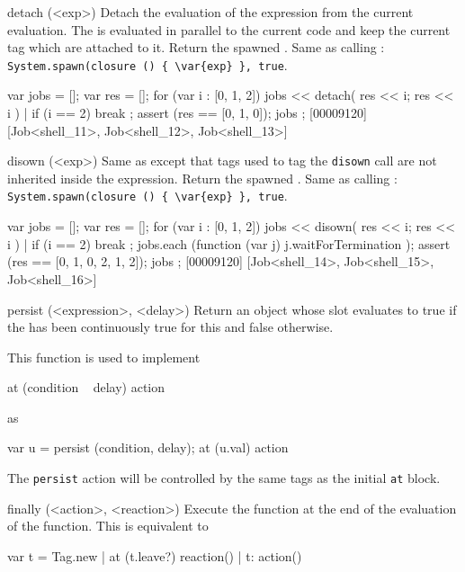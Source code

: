 \begin{urbiscriptapi}

\item[detach](<exp>)%
  Detach the evaluation of the expression  from the current
  evaluation.  The  is evaluated in parallel to the current code
  and keep the current tag which are attached to it.  Return the spawned
  .  Same as calling :
  \lstinline|System.spawn(closure () { \var{exp} }, true|.

\begin{urbiscript}
{
  var jobs = [];
  var res = [];
  for (var i : [0, 1, 2])
  {
    jobs << detach({ res << i; res << i }) |
    if (i == 2)
      break
  };
  assert (res == [0, 1, 0]);
  jobs
};
[00009120] [Job<shell_11>, Job<shell_12>, Job<shell_13>]
\end{urbiscript}

\item[disown](<exp>)%
  Same as  except that tags used to tag the
  \lstinline|disown| call are not inherited inside the expression.  Return
  the spawned .  Same as calling :
  \lstinline|System.spawn(closure () { \var{exp} }, true|.

\begin{urbiscript}
{
  var jobs = [];
  var res = [];
  for (var i : [0, 1, 2])
  {
    jobs << disown({ res << i; res << i }) |
    if (i == 2)
      break
  };
  jobs.each (function (var j) { j.waitForTermination });
  assert (res == [0, 1, 0, 2, 1, 2]);
  jobs
};
[00009120] [Job<shell_14>, Job<shell_15>, Job<shell_16>]
\end{urbiscript}

\item[persist](<expression>, <delay>)%
  Return an object whose  slot evaluates to true if the
   has been continuously true for this  and false
  otherwise.

  This function is used to implement

\begin{urbiunchecked}
at (condition ~ delay)
  action
\end{urbiunchecked}

  \noindent
  as

\begin{urbiunchecked}
var u = persist (condition, delay);
at (u.val)
  action
\end{urbiunchecked}

  The \lstinline|persist| action will be controlled by the same tags
  as the initial \lstinline|at| block.


\item[finally](<action>, <reaction>)%
  Execute the  function at the end of the evaluation of
  the  function.  This is equivalent to

\begin{urbiunchecked}
{
  var t = Tag.new |
  at (t.leave?)
    reaction() |
  t: action()
}
\end{urbiunchecked}
\end{urbiscriptapi}


